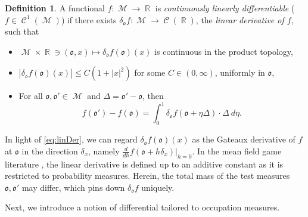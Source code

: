 \documentclass[11pt]{article}
\def\mo{\mathfrak{o}}
\theoremstyle{plain}
\theoremstyle{definition}
\newtheorem{definition}{Definition}
\DeclareMathOperator{\R}{\mathbb{R}}
\DeclareMathOperator{\calC}{\mathcal{C}}
\DeclareMathOperator{\calM}{\mathcal{M}}
\begin{document}
\begin{definition}\label{def:linearderivative}
   A functional   $f:\calM \to \R$  is  \textit{continuously linearly differentiable} 
 ($f\in \calC^1(\calM)$)  if there exists  $\delta_\mo  f: \calM \to \calC(\R)$,
   the \textit{linear derivative of $f$},  such that

   \begin{itemize}
       \item[I.]   $\calM\times \R \ni   (\mo,x) \mapsto \delta_\mo  f(\mo)(x)$ is continuous in the product topology, 

        \item[II.]  $|\delta_\mo  f(\mo)(x)| \le C(1+|x|^2)$ for some  $C\in (0,\infty)$, uniformly in $\mo$,
       
       \item[III.]   For all $\mo,\mo'\in \calM$ and $\Delta = \mo' - \mo$, then 
    \begin{equation}\label{eq:linDer}
        f(\mo') - f(\mo) = \int_0^1  \delta_\mo f(\mo + \eta \Delta) \cdot  \Delta  \ d\eta. 
    \end{equation}
   \end{itemize}

   
\end{definition}
 In light of \eqref{eq:linDer}, we can regard  $\delta_{\mo}f(\mo)(x)$ as the Gateaux derivative of $f$ at $\mo$ in the direction  $\delta_x$, namely
   $ \frac{d}{dh} f(\mo+h\delta_x)|_{h=0}.$ 
In the mean field game literature \cite{CarmonaDelarue,CardDelLasLio,TTZ},
the linear derivative is defined up to an additive constant as it is restricted to  probability measures.   Herein, %
the  total mass of the test measures $\mo,\mo'$ may differ, which pins down  $\delta_\mo  f$  uniquely. 

Next, we introduce  a notion of differential tailored to occupation measures. 
\end{document}
